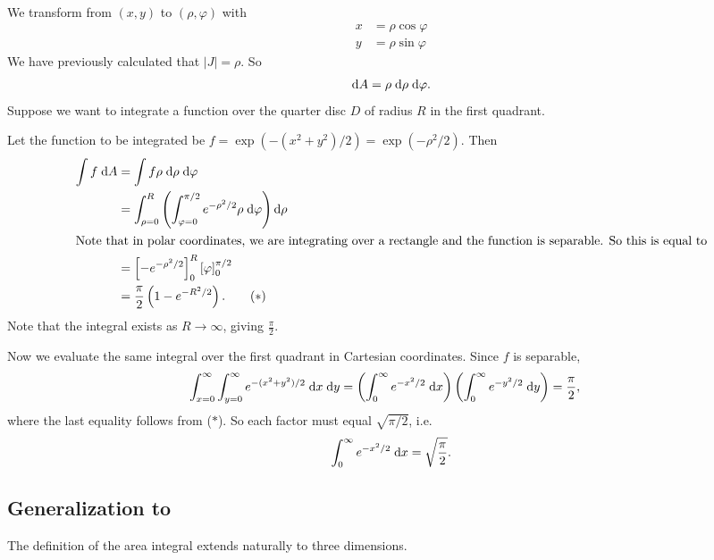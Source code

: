 \documentclass[a4paper]{article}
\begin{document}
\begin{eg}
  We transform from $(x, y)$ to $(\rho, \varphi)$ with
  \begin{align*}
    x &= \rho\cos \varphi\\
    y &= \rho\sin \varphi
  \end{align*}
  We have previously calculated that $|J| = \rho$. So
  \[
    \mathrm{d} A = \rho \;\mathrm{d} \rho \;\mathrm{d} \varphi.
  \]
  Suppose we want to integrate a function over the quarter disc $D$ of radius $R$ in the first quadrant.
  \begin{center}
  \end{center}
  Let the function to be integrated be $f = \exp(-(x^2 + y^2)/2) = \exp(-\rho^2/2)$. Then
  \begin{align*}
    \int f\;\mathrm{d} A &= \int f\rho\;\mathrm{d}\rho\;\mathrm{d}\varphi\\
    &=\int_{\rho=0}^R\left(\int_{\varphi=0}^{\pi/2}e^{-\rho^2/2}\rho \;\mathrm{d} \varphi\right)\mathrm{d} \rho\\
    \intertext{Note that in polar coordinates, we are integrating over a rectangle and the function is separable. So this is equal to}
    &= \left[-e^{-\rho^2/2}\right]^R_0\left[\varphi\right]_0^{\pi/2}\\
    &= \frac{\pi}{2}\left( 1 - e^{-R^2/2}\right).\tag{$*$}
  \end{align*}
  Note that the integral exists as $R\to \infty$, giving $\frac{\pi}{2}$.

  Now we evaluate the same integral over the first quadrant in Cartesian coordinates. Since $f$ is separable,
  \begin{align*}
    \int_{x = 0}^{\infty} \int_{y=0}^\infty e^{-(x^2 + y^2)/2}\;\mathrm{d} x\;\mathrm{d} y
    &= \left(\int_0^\infty e^{-x^2/2}\;\mathrm{d} x\right)\left(\int_0^\infty e^{-y^2/2}\;\mathrm{d} y\right)
    = \frac{\pi}{2},
  \end{align*}
  where the last equality follows from ($*$). So each factor must equal $\sqrt{\pi/2}$, i.e.
  \[
    \int_0^\infty e^{-x^2/2}\;\mathrm{d} x = \sqrt{\frac{\pi}{2}}.
  \]

\end{eg}

\subsection{Generalization to }
The definition of the area integral extends naturally to three dimensions.
\end{document}
